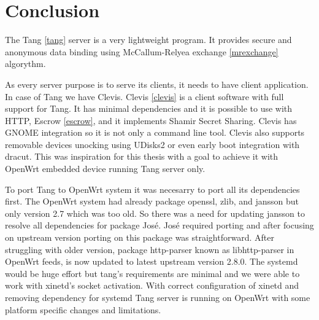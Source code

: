 \chapter{Conclusion}\label{conlusion}



The Tang \ref{tang} server is a very lightweight program.
It provides secure and anonymous data binding using McCallum-Relyea exchange \ref{mrexchange} algorythm.

As every server purpose is to serve its clients, it needs to have client application.
In case of Tang we have Clevis.
Clevis \ref{clevis} is a client software with full support for Tang.
It has minimal dependencies and it is possible to use with HTTP, Escrow \ref{escrow}, and it implements Shamir Secret Sharing.
Clevis has GNOME integration so it is not only a command line tool.
Clevis also supports removable devices unocking using UDisks2 or even early boot integration with dracut.
This was inspiration for this thesis with a goal to achieve it with OpenWrt embedded device running Tang server only.

To port Tang to OpenWrt system it was necesarry to port all its dependencies first.
The OpenWrt system had already package openssl, zlib, and jansson but only version 2.7 which was too old.
So there was a need for updating jansson to resolve all dependencies for package José.
José required porting and after focusing on upstream version porting on this package was straightforward.
After struggling with older version, package http-parser known as libhttp-parser in OpenWrt feeds, is now updated to latest upstream version 2.8.0.
The systemd would be huge effort but tang's requirements are minimal and we were able to work with xinetd's socket activation.
With correct configuration of xinetd and removing dependency for systemd Tang server is running on OpenWrt with some platform specific changes and limitations.
